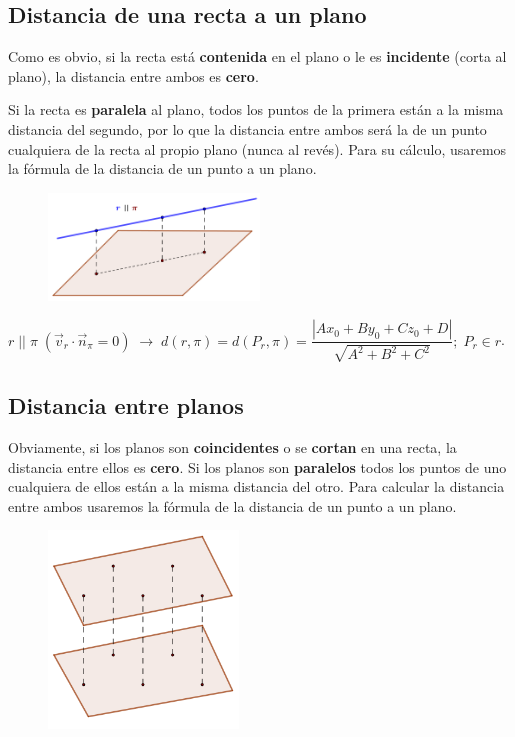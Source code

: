 \subsection{Distancia de una recta a un plano}

Como es obvio, si la recta está \textbf{contenida} en el plano o le es \textbf{incidente} (corta al plano), la distancia entre ambos es \textbf{cero}.
\begin{multicols}{2}
\small{Si la recta es \textbf{paralela} al plano, todos los puntos de la primera están a la misma distancia del segundo, por lo que la distancia entre ambos será la de un punto cualquiera de la recta al propio plano (nunca al revés). Para su cálculo, usaremos la fórmula de la distancia de un punto a un plano}\normalsize{.}
\begin{figure}[H]
		\centering
		\includegraphics[width=0.5\textwidth]{imagenes/imagenes11/T11IM13.png}
	\end{figure}
\end{multicols}
\noindent \small{$r\;||\;\pi \;(\vec v_r \cdot \vec n_{\pi}=0)\;\to \; d(r,\pi)=d(P_r,\pi)=\dfrac {|Ax_0+By_0+Cz_0+D|}{\sqrt{A^2+B^2+C^2}};\;P_r\in r$}\normalsize{.}

\subsection{Distancia entre planos}

\begin{multicols}{2}
Obviamente, si los planos son \textbf{coincidentes} o se \textbf{cortan} en una recta, la distancia entre ellos es \textbf{cero}. Si los planos son \textbf{paralelos} todos los puntos de uno cualquiera de ellos están a la misma distancia del otro. Para calcular la distancia entre ambos usaremos la fórmula de la distancia de un punto a un plano.

\begin{figure}[H]
		\centering
		\includegraphics[width=0.45\textwidth]{imagenes/imagenes11/T11IM14.png}
	\end{figure}
\end{multicols}

